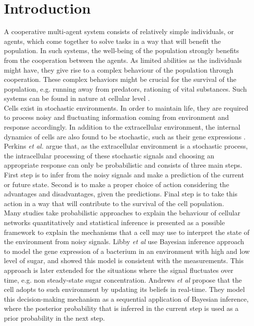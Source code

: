 \chapter{Introduction}
A cooperative multi-agent system consists of relatively simple individuals, or agents, which come together to solve tasks in a way that will benefit the population. In such systems, the well-being of the population strongly benefits from the cooperation between the agents. As limited abilities as the individuals might have, they give rise to a complex behaviour of the population through cooperation. These complex behaviors might be crucial for the survival of the population, e.g. running away from predators, rationing of vital substances. Such systems can be found in nature at cellular level \cite{Perkins2009a}. \\
Cells exist in stochastic environments. In order to maintain life, they are required to process noisy and fluctuating information coming from environment and response accordingly. In addition to the extracellular environment, the internal dynamics of cells are also found to be stochastic, such as their gene expressions \cite{Shahrezaei2008}. \\
Perkins \textit{et al.} \cite{Perkins2009a} argue that, as the extracellular environment is a stochastic process, the intracellular processing of these stochastic signals and choosing an appropriate response can only be probabilistic and consists of three main steps. First step is to infer from the noisy signals and make a prediction of the current or future state. Second is to make a proper choice of action considering the advantages and disadvantages, given the predictions. Final step is to take this action in a way that will contribute to the survival of the cell population. \\
Many studies take probabilistic approaches to explain the behaviour of cellular networks quantitatively and statistical inference is presented as a possible framework to explain the mechanisms that a cell may use to interpret the state of the environment from noisy signals. Libby \textit{et al} \cite{Libby2007} use Bayesian inference approach to model the gene expression of a bacterium in an environment with high and low level of sugar, and showed this model is consistent with the measurements. This approach is later extended for the situations where the signal fluctuates over time, e.g. non steady-state sugar concentration. Andrews \textit{et al} \cite{Andrews2006} propose that the cell adopts to such environment by updating its beliefs in real-time. They model this decision-making mechanism as a sequential application of Bayesian inference, where the posterior probability that is inferred in the current step is used as a prior probability in the next step.\\
